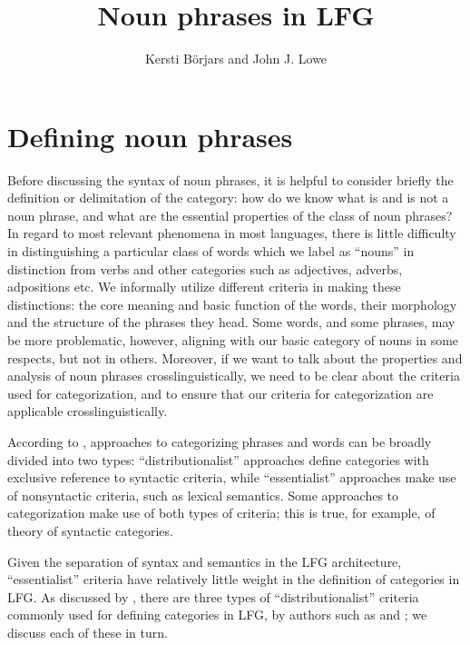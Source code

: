 \documentclass[output=paper,hidelinks]{langscibook}
\author{Kersti Börjars\affiliation{University of Oxford} and John J. Lowe\affiliation{University of Oxford}}
\title{Noun phrases in LFG}
\begin{document}
\maketitle
\label{chap:Nominal}

\section{Defining noun phrases}\label{sec:nominal:def}

Before discussing the syntax of noun phrases, it is helpful to consider briefly the definition or delimitation of the category: how do we know what is and is not a noun phrase, and what are the essential properties of the class of noun phrases? In regard to most relevant phenomena in most languages, there is little difficulty in distinguishing a particular class of words which we label as ``nouns'' in distinction from verbs and other categories such as adjectives, adverbs, adpositions etc. We informally utilize different criteria in making these distinctions: the core meaning and basic function of the words, their morphology and the structure of the phrases they head. Some words, and some phrases, may be more problematic, however, aligning with our basic category of nouns in some respects, but not in others. Moreover, if we want to talk about the properties and analysis of noun phrases crosslinguistically, we need to be clear about the criteria used for categorization, and to ensure that our criteria for categorization are applicable crosslinguistically.


According to \citet[1297--1298]{KornfiltWhitman11a}, approaches to categorizing phrases and words can be broadly divided into two types: ``distributionalist'' approaches define categories with exclusive reference to syntactic criteria, while ``essentialist'' approaches make use of nonsyntactic criteria, such as lexical semantics. Some approaches to categorization make use of both types of criteria; this is true, for example, of  theory of syntactic categories.

Given the separation of syntax and semantics in the LFG architecture, ``essentialist'' criteria have relatively little weight in the definition of categories in LFG. As discussed by \citet{Lowe19b}, there are three types of ``distributionalist'' criteria commonly used for defining categories in LFG, by authors such as \citet{Spencer15} and \citet{BresnanEtAl2016}; we discuss each of these in turn.
\end{document}
